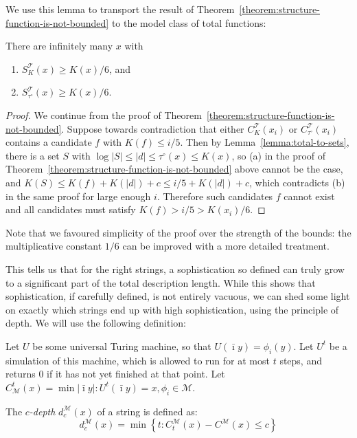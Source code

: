 \documentclass{style/llncs}
\newcommand{\M}{\mathscr M}
\newcommand{\T}{\mathscr T}
\begin{document}
We use this lemma to transport the result of Theorem~\ref{theorem:structure-function-is-not-bounded} to the model class of total functions:

\begin{theorem}
There are infinitely many $x$ with 
\begin{enumerate}
  \item $S^\T_K(x) \geq K(x)/6$, {and}\label{eq:poezenvoer}
  \item $S^\T_{\tau^\circ}(x) \geq K(x)/6$. \label{eq:hondevoer}
\end{enumerate}
\end{theorem}
\begin{proof}
We continue from the proof of Theorem~\ref{theorem:structure-function-is-not-bounded}. Suppose towards contradiction that either $C^\T_K(x_i)$ or $C^\T_{\tau^\circ}(x_i)$ contains a candidate $f$ with $K(f)\le i/5$. Then by Lemma~\ref{lemma:total-to-sets}, there is a set $S$ with $\log|S|\le|d|\le\tau^\circ(x)\le K(x)$, so (a) in the proof of Theorem~\ref{theorem:structure-function-is-not-bounded} above cannot be the case, and $K(S)\le K(f)+K(|d|)+c\le i/5+K(|d|)+c$, which contradicts (b) in the same proof for large enough $i$. Therefore such candidates $f$ cannot exist and all candidates must satisfy $K(f)>i/5>K(x_i)/6$.
\end{proof}
Note that we favoured simplicity of the proof over the strength of the bounds: the multiplicative constant $1/6$ can be improved with a more detailed treatment.

This tells us that for the right strings, a sophistication so defined can truly grow to a significant part of the total description length. While this shows that sophistication, if carefully defined, is not entirely vacuous, we can shed some light on exactly which strings end up with high sophistication, using the principle of depth. We will use the following definition:

\begin{definition}[depth]
Let $U$ be some universal Turing machine, so that $U(\bar\imath y) = \phi_i(y)$. Let $U^t$ be a simulation of this machine, which is allowed to run for at most $t$ steps, and returns $0$ if it has not yet finished at that point. Let $C^t_\M(x) = \min{|\bar\imath y| : U^t(\bar\imath y) = x, \phi_i \in \M}$.

The \emph{$c$-depth} $d^\M_c(x)$ of a string is defined as:
\[
	d^\M_c(x) = \min \left\{t : C^\M_t(x) - C^\M(x) \leq c \right\}
\] 
\end{definition}
\end{document}
